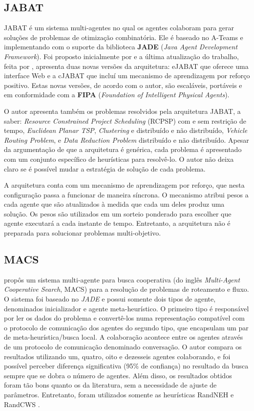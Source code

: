 \subsection{JABAT}
JABAT é um sistema multi-agentes no qual os agentes colaboram para gerar soluções de problemas de otimização combinatória. Ele é baseado no A-Teams e implementando com o suporte da biblioteca \textbf{JADE} (\textit{Java Agent Development Framework}). Foi proposto inicialmente por  e a última atualização do trabalho, feita por , apresenta duas novas versões da arquitetura: eJABAT que oferece uma interface Web e a cJABAT que incluí um mecanismo de aprendizagem por reforço positivo. Estas novas versões, de acordo com o autor, são escaláveis, portáveis e em conformidade com a \textbf{FIPA} (\textit{Foundation of Intelligent Physical Agents}). 

O autor apresenta também os problemas resolvidos pela arquitetura JABAT, a saber: \textit{Resource Constrained Project Scheduling} (RCPSP) com e sem restrição de tempo, \textit{Euclidean Planar TSP}, \textit{Clustering} e distribuído e não distribuído, \textit{Vehicle Routing Problem}, e \textit{Data Reduction Problem} distribuído e não distribuído. Apesar da argumentação de que a arquitetura é genérica, cada problema é apresentado com um conjunto específico de heurísticas para resolvê-lo. O autor não deixa claro se é possível mudar a estratégia de solução de cada problema. 

A arquitetura conta com um mecanismo de aprendizagem por reforço, que nesta configuração passa a funcionar de maneira síncrona. O mecanismo atribui pesos a cada agente que são atualizados à medida que cada um deles produz uma solução. Os pesos são utilizados em um sorteio ponderado para escolher que agente executará a cada instante de tempo. Entretanto, a arquitetura não é preparada para solucionar problemas multi-objetivo. 

\subsection{MACS}
 propôs um sistema multi-agente para busca cooperativa (do inglês \textit{Multi-Agent Cooperative Search}, MACS) para a resolução de problemas de roteamento e fluxo. O sistema foi baseado no \textit{JADE} e possui somente dois tipos de agente, denominados inicializador e agente meta-heurístico. O primeiro tipo é responsável por ler os dados do problema e convertê-los numa representação compatível com o protocolo de comunicação dos agentes  do segundo tipo, que encapsulam um par de meta-heurística/busca local. A colaboração acontece entre os agentes através de um protocolo de comunicação denominado conversação. O autor compara os resultados utilizando um, quatro, oito e dezesseis agentes colaborando, e foi possível perceber diferença significativa (95\% de confiança) no resultado da busca sempre que se dobra o número de agentes. Além disso, os resultados obtidos foram tão bons quanto os da literatura, sem a necessidade de ajuste de parâmetros. Entretanto, foram utilizados somente as heurísticas RandNEH \cite{juan2010b} e RandCWS \cite{juan2010a}.

